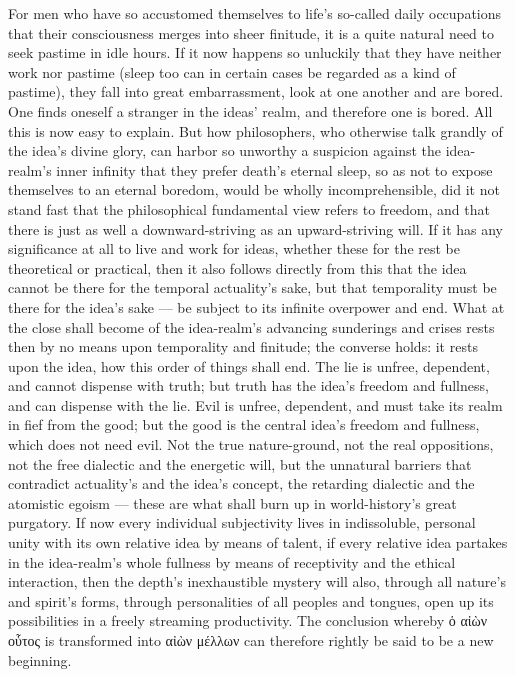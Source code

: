 \documentclass[12pt]{book}
\begin{document}
For men who have so accustomed themselves to life's so-called daily
occupations that their consciousness merges into sheer finitude, it is a
quite natural need to seek pastime in idle hours. If it now happens so
unluckily that they have neither work nor pastime (sleep too can in certain
cases be regarded as a kind of pastime), they fall into great embarrassment,
look at one another and are bored. One finds oneself a stranger in the
ideas' realm, and therefore one is bored. All this is now easy to explain.
But how philosophers, who otherwise talk grandly of the idea's divine glory,
can harbor so unworthy a suspicion against the idea-realm's inner infinity
that they prefer death's eternal sleep, so as not to expose themselves to an
eternal boredom, would be wholly incomprehensible, did it not stand fast
that the philosophical fundamental view refers to freedom, and that there is
just as well a downward-striving as an upward-striving will. If it has any
significance at all to live and work for ideas, whether these for the rest
be theoretical or practical, then it also follows directly from this that
the idea cannot be there for the temporal actuality's sake, but that
temporality must be there for the idea's sake --- be subject to its infinite
overpower and end. What at the close shall become of the idea-realm's
advancing sunderings and crises rests then by no means upon temporality and
finitude; the converse holds: it rests upon the idea, how this order of
things shall end. The lie is unfree, dependent, and cannot dispense with
truth; but truth has the idea's freedom and fullness, and can dispense with
the lie. Evil is unfree, dependent, and must take its realm in fief from the
good; but the good is the central idea's freedom and fullness, which does
not need evil. Not the true nature-ground, not the real oppositions, not the
free dialectic and the energetic will, but the unnatural barriers that
contradict actuality's and the idea's concept, the retarding dialectic and
the atomistic egoism --- these are what shall burn up in world-history's
great purgatory. If now every individual subjectivity lives in indissoluble,
personal unity with its own relative idea by means of talent, if every
relative idea partakes in the idea-realm's whole fullness by means of
receptivity and the ethical interaction, then the depth's inexhaustible
mystery will also, through all nature's and spirit's forms, through
personalities of all peoples and tongues, open up its possibilities in a
freely streaming productivity. The conclusion whereby ὁ αἰὼν οὗτος is
transformed into αἰὼν μέλλων can therefore rightly be said to be a new
beginning.
\end{document}
